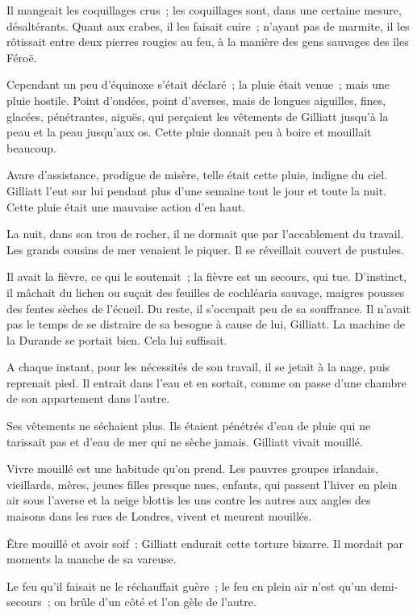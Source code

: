 \documentclass[french,twoside]{book} %
\begin{document}
Il mangeait les coquillages crus ; les coquillages sont, dans une certaine mesure, désaltérants. Quant aux crabes, il les faisait cuire ; n’ayant pas de marmite, il les rôtissait entre deux pierres rougies au feu, à la manière des gens sauvages des îles Féroë.\par
 Cependant un peu d’équinoxe s’était déclaré ; la pluie était venue ; mais une pluie hostile. Point d’ondées, point d’averses, mais de longues aiguilles, fines, glacées, pénétrantes, aiguës, qui perçaient les vêtements de Gilliatt jusqu’à la peau et la peau jusqu’aux os. Cette pluie donnait peu à boire et mouillait beaucoup.\par
Avare d’assistance, prodigue de misère, telle était cette pluie, indigne du ciel. Gilliatt l’eut sur lui pendant plus d’une semaine tout le jour et toute la nuit. Cette pluie était une mauvaise action d’en haut.\par
La nuit, dans son trou de rocher, il ne dormait que par l’accablement du travail. Les grands cousins de mer venaient le piquer. Il se réveillait couvert de pustules.\par
Il avait la fièvre, ce qui le soutenait ; la fièvre est un secours, qui tue. D’instinct, il mâchait du lichen ou suçait des feuilles de cochléaria sauvage, maigres pousses des fentes sèches de l’écueil. Du reste, il s’occupait peu de sa souffrance. Il n’avait pas le temps de se distraire de sa besogne à cause de lui, Gilliatt. La machine de la Durande se portait bien. Cela lui suffisait.\par
A chaque instant, pour les nécessités de son travail, il se jetait à la nage, puis reprenait pied. Il entrait dans l’eau et en sortait, comme on passe d’une chambre de son appartement dans l’autre.\par
Ses vêtements ne séchaient plus. Ils étaient pénétrés d’eau de pluie qui ne tarissait pas et d’eau de mer qui ne sèche jamais. Gilliatt vivait mouillé.\par
 Vivre mouillé est une habitude qu’on prend. Les pauvres groupes irlandais, vieillards, mères, jeunes filles presque nues, enfants, qui passent l’hiver en plein air sous l’averse et la neige blottis les uns contre les autres aux angles des maisons dans les rues de Londres, vivent et meurent mouillés.\par
Être mouillé et avoir soif ; Gilliatt endurait cette torture bizarre. Il mordait par moments la manche de sa vareuse.\par
Le feu qu’il faisait ne le réchauffait guère ; le feu en plein air n’est qu’un demi-secours ; on brûle d’un côté et l’on gèle de l’autre.\par
\end{document}
